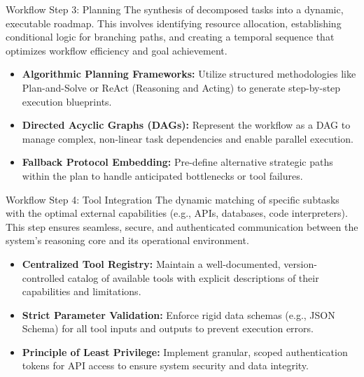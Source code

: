 \documentclass[
11pt,notheorems,hyperref={pdfauthor=whatever}
]{beamer}
\begin{document}
\begin{frame}{Workflow Step 3: Planning}
	The synthesis of decomposed tasks into a dynamic, executable roadmap. This involves identifying resource allocation, establishing conditional logic for branching paths, and creating a temporal sequence that optimizes workflow efficiency and goal achievement.
	
	\vspace{0.3cm}
	
	\begin{itemize}
		\item \textbf{Algorithmic Planning Frameworks:} Utilize structured methodologies like Plan-and-Solve or ReAct (Reasoning and Acting) to generate step-by-step execution blueprints.
		\item \textbf{Directed Acyclic Graphs (DAGs):} Represent the workflow as a DAG to manage complex, non-linear task dependencies and enable parallel execution.
		\item \textbf{Fallback Protocol Embedding:} Pre-define alternative strategic paths within the plan to handle anticipated bottlenecks or tool failures.
	\end{itemize}
\end{frame}

\begin{frame}{Workflow Step 4: Tool Integration}
	The dynamic matching of specific subtasks with the optimal external capabilities (e.g., APIs, databases, code interpreters). This step ensures seamless, secure, and authenticated communication between the system's reasoning core and its operational environment.
	
	\vspace{0.3cm}
	
	\begin{itemize}
		\item \textbf{Centralized Tool Registry:} Maintain a well-documented, version-controlled catalog of available tools with explicit descriptions of their capabilities and limitations.
		\item \textbf{Strict Parameter Validation:} Enforce rigid data schemas (e.g., JSON Schema) for all tool inputs and outputs to prevent execution errors.
		\item \textbf{Principle of Least Privilege:} Implement granular, scoped authentication tokens for API access to ensure system security and data integrity.
	\end{itemize}
\end{frame}
\end{document}

